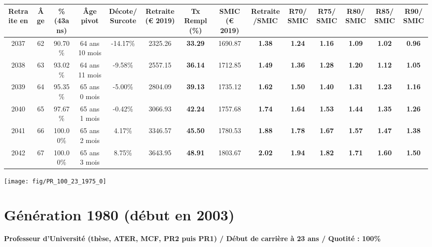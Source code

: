 \begin{adjustbox}{max width=\textwidth} 
\begin{tabular}[htb]{|c|c||c|c|c||c|c||c|c||c|c|c|c|c|} 
\hline 
 Retraite en &  Âge &  \%(43ans) &  Âge pivot &  Décote/Surcote &  Retraite (\euro{} 2019) &  Tx Rempl(\%) &  SMIC (\euro{} 2019) &  Retraite/SMIC &  R70/SMIC &  R75/SMIC &  R80/SMIC &  R85/SMIC &  R90/SMIC \\ 
\hline \hline 
 2037 &  62 &  90.70\% &  64 ans 10 mois &  -14.17\% &  2325.26 &  {\bf 33.29} &  1690.87 &  {\bf 1.38} &  {\bf 1.24} &  {\bf 1.16} &  {\bf 1.09} &  {\bf 1.02} &  {\bf {\color{red} 0.96}} \\ 
\hline 
 2038 &  63 &  93.02\% &  64 ans 11 mois &  -9.58\% &  2557.15 &  {\bf 36.14} &  1712.85 &  {\bf 1.49} &  {\bf 1.36} &  {\bf 1.28} &  {\bf 1.20} &  {\bf 1.12} &  {\bf 1.05} \\ 
\hline 
 2039 &  64 &  95.35\% &  65 ans 0 mois &  -5.00\% &  2804.09 &  {\bf 39.13} &  1735.12 &  {\bf 1.62} &  {\bf 1.50} &  {\bf 1.40} &  {\bf 1.31} &  {\bf 1.23} &  {\bf 1.16} \\ 
\hline 
 2040 &  65 &  97.67\% &  65 ans 1 mois &  -0.42\% &  3066.93 &  {\bf 42.24} &  1757.68 &  {\bf 1.74} &  {\bf 1.64} &  {\bf 1.53} &  {\bf 1.44} &  {\bf 1.35} &  {\bf 1.26} \\ 
\hline 
 2041 &  66 &  100.00\% &  65 ans 2 mois &  4.17\% &  3346.57 &  {\bf 45.50} &  1780.53 &  {\bf 1.88} &  {\bf 1.78} &  {\bf 1.67} &  {\bf 1.57} &  {\bf 1.47} &  {\bf 1.38} \\ 
\hline 
 2042 &  67 &  100.00\% &  65 ans 3 mois &  8.75\% &  3643.95 &  {\bf 48.91} &  1803.67 &  {\bf 2.02} &  {\bf 1.94} &  {\bf 1.82} &  {\bf 1.71} &  {\bf 1.60} &  {\bf 1.50} \\ 
\hline 
\hline 
\end{tabular} 
\end{adjustbox} 
 
 \vspace{0.1cm} 

 {\hspace{-2.2cm}\texttt{[image: fig/PR\_100\_23\_1975\_0]}} 

\newpage 
 
\section{Génération 1980 (début en 2003)\label{PR_100_23_1980_0}} 
 
{\bf \noindent Professeur d'Université (thèse, ATER, MCF, PR2 puis PR1) / Début de carrière à 23 ans / Quotité : 100\%}  ~ 

